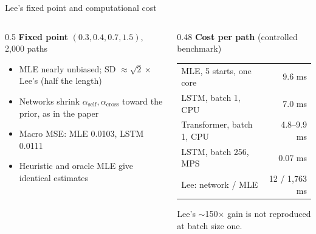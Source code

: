 \documentclass[aspectratio=169,11pt]{beamer}
\newcommand{\aself}{\alpha_{\mathrm{self}}}
\newcommand{\across}{\alpha_{\mathrm{cross}}}
\begin{document}
\begin{frame}{Lee's fixed point and computational cost}
  \begin{columns}[T]
    \begin{column}{0.5\textwidth}
      \textbf{Fixed point} \((0.3, 0.4, 0.7, 1.5)\), 2,000 paths
      \begin{itemize}
        \item MLE nearly unbiased; SD \(\approx\sqrt2\times\) Lee's (half the length)
        \item Networks shrink \(\aself,\across\) toward the prior, as in the paper
        \item Macro MSE: MLE 0.0103, LSTM 0.0111
        \item Heuristic and oracle MLE give identical estimates
      \end{itemize}
    \end{column}
    \begin{column}{0.48\textwidth}
      \textbf{Cost per path} (controlled benchmark)
      \par\smallskip
      \footnotesize
      \begin{tabular}{lr}
        \toprule
        MLE, 5 starts, one core & 9.6 ms\\
        LSTM, batch 1, CPU & 7.0 ms\\
        Transformer, batch 1, CPU & 4.8--9.9 ms\\
        LSTM, batch 256, MPS & 0.07 ms\\
        \midrule
        Lee: network / MLE & 12 / 1,763 ms\\
        \bottomrule
      \end{tabular}
      \par\medskip
      Lee's \(\sim\)150\(\times\) gain is not reproduced at batch size one.
    \end{column}
  \end{columns}
\end{frame}
\end{document}
